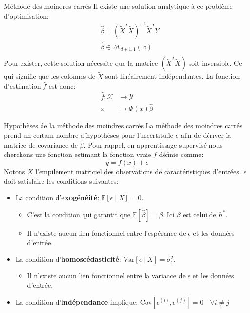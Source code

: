 \begin{frame}{Méthode des moindres carrés}
	Il existe une solution analytique à ce problème d'optimisation:
	\begin{equation}
		\begin{aligned}
			&\hat{\beta} = \left( \tilde{X}^T \tilde{X}\right)^{-1} \tilde{X}^T Y \\
			&\hat{\beta} \in \mathcal{M}_{d+1, 1}(\mathbb{R}) \\
			\nonumber
		\end{aligned}
	\end{equation}
	Pour exister, cette solution nécessite que la matrice $\left(\tilde{X}^T \tilde{X}\right)$ soit inversible. Ce qui signifie que les colonnes de $\tilde{X}$ sont linéairement indépendantes.
	La fonction d'estimation $\hat{f}$ est donc:
	\begin{equation}
		\begin{aligned}
			\hat{f}: \mathcal{X} &\to \mathcal{Y} \\
			x &\mapsto \Phi(x) \hat{\beta}
			\nonumber
		\end{aligned}
	\end{equation}
\end{frame}

\begin{frame}{Hypothèses de la méthode des moindres carrés}
	La méthode des moindres carrés prend un certain nombre d'hypothèses pour l'incertitude $\epsilon$ afin de dériver la matrice de covariance de $\hat{\beta}$. Pour rappel, en apprentissage supervisé nous cherchons une fonction estimant la fonction vraie $f$ définie comme:
	\begin{equation}
		y = f(x) + \epsilon
		\nonumber
	\end{equation}
	Notons $X$ l'empilement matriciel des observations de caractéristiques d'entrées. $\epsilon$ doit satisfaire les conditions suivantes:
	\begin{itemize}
		\item La condition d'\textbf{exogénéité}: $\mathbb{E}[\epsilon \mid X] = 0$.
		\begin{itemize}
			\item C'est la condition qui garantit que $\mathbb{E}[\hat{\beta}] = \beta$. Ici $\beta$ est celui de $h^*$.
			\item Il n'existe aucun lien fonctionnel entre l'espérance de $\epsilon$ et les données d'entrée.
		\end{itemize}
		\item La condition d'\textbf{homoscédasticité}: $\text{Var}[\epsilon \mid X] = \sigma_{\epsilon}^2$.
		\begin{itemize}
			\item Il n'existe aucun lien fonctionnel entre la variance de $\epsilon$ et les données d'entrée.
		\end{itemize}
		\item La condition d'\textbf{indépendance} implique: $\text{Cov}[\epsilon^{(i)}, \epsilon^{(j)}] =0 \quad \forall i \ne j$
	\end{itemize}
\end{frame}

